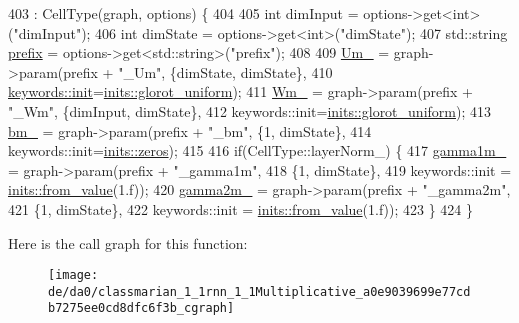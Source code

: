 \begin{DoxyCode}
403       : CellType(graph, options) \{
404 
405       \textcolor{keywordtype}{int} dimInput = options->get<\textcolor{keywordtype}{int}>(\textcolor{stringliteral}{"dimInput"});
406       \textcolor{keywordtype}{int} dimState = options->get<\textcolor{keywordtype}{int}>(\textcolor{stringliteral}{"dimState"});
407       std::string \hyperlink{namespacemarian_1_1keywords_aa2cadd13ac94307ff92c68efb57264ac}{prefix} = options->get<std::string>(\textcolor{stringliteral}{"prefix"});
408 
409       \hyperlink{classmarian_1_1rnn_1_1Multiplicative_a5048c83eb0045b7a85304e3557727e07}{Um\_} = graph->param(prefix + \textcolor{stringliteral}{"\_Um"}, \{dimState, dimState\},
410                          \hyperlink{namespacemarian_1_1keywords_afdd3807e3d6fe2bc979d11fa0cf3ee3e}{keywords::init}=\hyperlink{namespacemarian_1_1inits_a8838c47537f434b855491cd3ed97ccd1}{inits::glorot\_uniform});
411       \hyperlink{classmarian_1_1rnn_1_1Multiplicative_acea0bc134660ffa076fad2536207fedb}{Wm\_} = graph->param(prefix + \textcolor{stringliteral}{"\_Wm"}, \{dimInput, dimState\},
412                          keywords::init=\hyperlink{namespacemarian_1_1inits_a8838c47537f434b855491cd3ed97ccd1}{inits::glorot\_uniform});
413       \hyperlink{classmarian_1_1rnn_1_1Multiplicative_a26cdb5d0561b1958105dbdb56c4ee13f}{bm\_} = graph->param(prefix + \textcolor{stringliteral}{"\_bm"}, \{1, dimState\},
414                          keywords::init=\hyperlink{namespacemarian_1_1inits_a1bd34fd256e3df7bb1e27955a7f2b359}{inits::zeros});
415 
416       \textcolor{keywordflow}{if}(CellType::layerNorm\_) \{
417         \hyperlink{classmarian_1_1rnn_1_1Multiplicative_a3708c56833f8a2c5a2a44fea9571ffd7}{gamma1m\_} = graph->param(prefix + \textcolor{stringliteral}{"\_gamma1m"},
418                                 \{1, dimState\},
419                                 keywords::init = \hyperlink{namespacemarian_1_1inits_a03723a199ab72a38a13b2b8644e8e1c2}{inits::from\_value}(1.f));
420         \hyperlink{classmarian_1_1rnn_1_1Multiplicative_a1984a6776106c31887279d6c60e3874c}{gamma2m\_} = graph->param(prefix + \textcolor{stringliteral}{"\_gamma2m"},
421                                 \{1, dimState\},
422                                 keywords::init = \hyperlink{namespacemarian_1_1inits_a03723a199ab72a38a13b2b8644e8e1c2}{inits::from\_value}(1.f));
423       \}
424     \}
\end{DoxyCode}


Here is the call graph for this function\+:
\nopagebreak
\begin{figure}[H]
\begin{center}
\leavevmode
\texttt{[image: de/da0/classmarian\_1\_1rnn\_1\_1Multiplicative\_a0e9039699e77cdb7275ee0cd8dfc6f3b\_cgraph]}
\end{center}
\end{figure}




